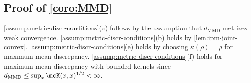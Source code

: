 \subsection{Proof of \cref{coro:MMD}}
 \cref{assump:metric-discr-conditions}(a) follows by the assumption that $d_{\mathrm{MMD}}$ metrizes weak convergence.
 \cref{assump:metric-discr-conditions}(b) holds by \cref{lem:ipm-joint-convex}.
 \cref{assump:metric-discr-conditions}(e) holds by choosing $\kappa(\rho) =\rho$ for maximum mean discrepancy. \cref{assump:metric-discr-conditions}(f) holds for maximum mean discrepancy with bounded kernels since $d_{\mathrm{MMD}} \le \sup_{x} \mcK(x,x)^{1/2} < \infty$.


